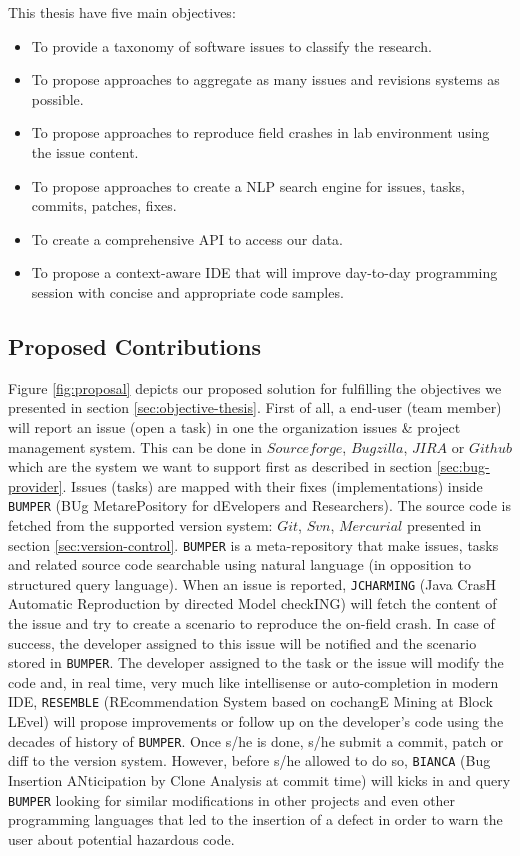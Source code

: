 This thesis have five main objectives:

\begin{itemize}
	\item To provide a taxonomy of software issues to classify the research.
	\item To propose approaches to aggregate as many issues and revisions systems as possible.
	\item To propose approaches to reproduce field crashes in lab environment using the issue content.
	\item To propose approaches to create a NLP search engine for issues, tasks, commits, patches, fixes.
	\item To create a comprehensive API to access our data.
	\item To propose a context-aware IDE that will improve day-to-day programming session with concise and appropriate code samples.
\end{itemize}

\subsection{Proposed Contributions \label{sec:solution}}

Figure \ref{fig:proposal} depicts our proposed solution for fulfilling the objectives we presented in section \ref{sec:objective-thesis}.
First of all, a end-user (team member) will report an issue (open a task) in one the organization issues \& project management system. This can be done in $Sourceforge$, $Bugzilla$, $JIRA$ or $Github$ which are the system we want to support first as described in section \ref{sec:bug-provider}.
Issues (tasks) are  mapped with their fixes (implementations) inside {\tt BUMPER} (BUg MetarePository for dEvelopers and Researchers). The source code is fetched from the supported version system: $Git$, $Svn$, $Mercurial$ presented in section \ref{sec:version-control}.
{\tt BUMPER} is a meta-repository that make issues, tasks and related source code searchable using natural language  (in opposition to structured query language).
When an issue is reported, {\tt JCHARMING} (Java CrasH Automatic Reproduction by directed Model checkING) will fetch the content of the issue and try to create a scenario to reproduce the on-field crash. In case of success, the developer assigned to this issue will be notified and the scenario stored in {\tt BUMPER}.
The developer assigned to the task or the issue will modify the code and, in real time, very much like intellisense or auto-completion in modern IDE, {\tt RESEMBLE} (REcommendation System based on cochangE Mining at Block LEvel) will propose improvements or follow up on the developer's code using the decades of history of {\tt BUMPER}. Once s/he is done, s/he submit a commit, patch or diff to the version system.
However, before s/he allowed to do so, {\tt BIANCA} (Bug Insertion ANticipation by Clone Analysis at commit time) will kicks in and query {\tt BUMPER} looking for similar modifications in other projects and even other programming languages that led to the insertion of a defect in order to warn the user about potential hazardous code.


